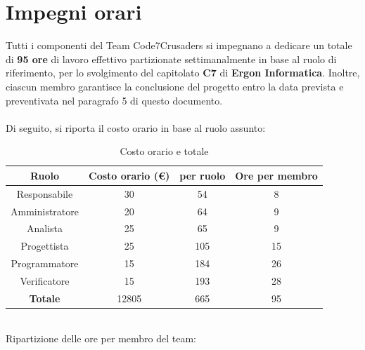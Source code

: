 \documentclass{article}
\begin{document}
\section{Impegni orari}
\label{sec:introduzione}
Tutti i componenti del Team Code7Crusaders si impegnano a dedicare un totale di \textbf{95 ore} di lavoro effettivo partizionate 
settimanalmente in base al ruolo di riferimento, per lo svolgimento del capitolato \textbf{C7} di \textbf{Ergon Informatica}. Inoltre,
ciascun membro garantisce la conclusione del progetto entro la data prevista e preventivata nel paragrafo 5 di questo documento.
\\
\\
Di seguito, si riporta il costo orario in base al ruolo assunto:
\begin{table}[!h]
	\begin{center}
		\begin{tabular}{ |c|c|c|c| }
			\hline
			\textbf{Ruolo}          & \textbf{Costo orario} (\euro) &  \textbf{per ruolo}   & \textbf{Ore per membro} \\
			\hline          
			Responsabile   & 30           &     54       &       8        \\
			Amministratore & 20           &     64       &       9        \\
			Analista       & 25           &     65       &       9       \\
			Progettista    & 25           &     105      &       15       \\
			Programmatore  & 15           &     184      &       26       \\
			Verificatore   & 15           &     193      &       28       \\
			\hline
			\textbf{Totale}         &    12805    &     665       &       95       \\
			\hline
		\end{tabular}
        \caption{Costo orario e totale}
    \end{center}
\end{table}
\\
Ripartizione delle ore per membro del team:
\end{document}
